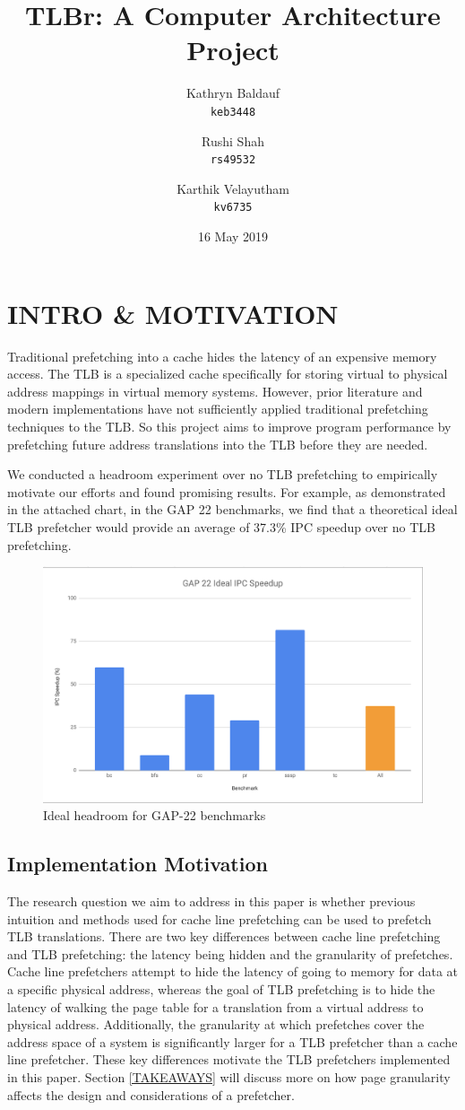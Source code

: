 \documentclass[conference]{IEEEtran}
\title{\LARGE \bf
    TLBr: A Computer Architecture Project
}
\author{
    Kathryn Baldauf \\ \texttt{keb3448}
    \and Rushi Shah \\ \texttt{rs49532} 
    \and Karthik Velayutham \\ \texttt{kv6735} 
}
\date{16 May 2019}
\begin{document}
\maketitle
\thispagestyle{empty}
\pagestyle{empty}

\section{INTRO \& MOTIVATION}
    Traditional prefetching into a cache hides the latency of an expensive memory access. The TLB is a specialized cache specifically for storing virtual to physical address mappings in virtual memory systems. However, prior literature and modern implementations have not sufficiently applied traditional prefetching techniques to the TLB. So this project aims to improve program performance by prefetching future address translations into the TLB before they are needed. 

    We conducted a headroom experiment over no TLB prefetching to empirically motivate our efforts and found promising results. For example, as demonstrated in the attached chart, in the GAP 22 benchmarks, we find that a theoretical ideal TLB prefetcher would provide an average of 37.3\% IPC speedup over no TLB prefetching. 
    
    \begin{figure}[h]
        \centering
            \includegraphics[width=.5\textwidth]{gap22_ideal}
        \caption{Ideal headroom for GAP-22 benchmarks}
    \end{figure}
 
    
    \subsection{Implementation Motivation}
        The research question we aim to address in this paper is whether previous intuition and methods used for cache line prefetching can be used to prefetch TLB translations. There are two key differences between cache line prefetching and TLB prefetching: the latency being hidden and the granularity of prefetches. Cache line prefetchers attempt to hide the latency of going to memory for data at a specific physical address, whereas the goal of TLB prefetching is to hide the latency of walking the page table for a translation from a virtual address to physical address. Additionally, the granularity at which prefetches cover the address space of a system is significantly larger for a TLB prefetcher than a cache line prefetcher. These key differences motivate the TLB prefetchers implemented in this paper. Section \ref{TAKEAWAYS} will discuss more on how page granularity affects the design and considerations of a prefetcher. 
\end{document}
